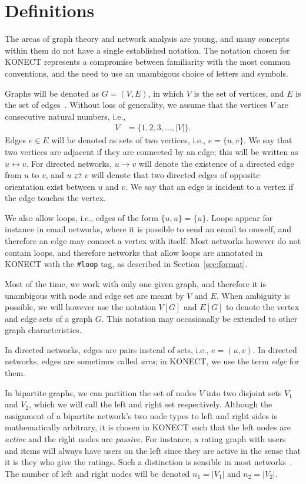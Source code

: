 \documentclass{article}
\begin{document}
\section{Definitions}
\label{sec:definitions}
The areas of graph theory and network analysis are young, and
many concepts within them do not have a single established notation.  The
notation chosen for KONECT represents a compromise between familiarity
with the most common conventions, and the need to use an unambigous
choice of letters and symbols. 

Graphs will be denoted as $G=(V,E)$, in which $V$ is the set of
vertices, and $E$ is the set of edges~\cite{b116}. Without loss of
generality, we assume that the vertices $V$ are consecutive natural
numbers, i.e.,
\begin{align}
  V &= \{ 1, 2, 3, \dotsc, |V| \}.
\end{align}
Edges $e\in E$ will be denoted as sets of two vertices, i.e.,
$e=\{u,v\}$.  We say that two vertices are adjacent if they are
connected by an edge; this will be written as $u \leftrightarrow v$. 
For directed networks, $u \rightarrow v$ will denote the existence of a
directed edge from $u$ to $v$, and $u \rightleftarrows v$ will denote
that two directed edges of opposite orientation exist between $u$ and $v$.
We say that an
edge is incident to a vertex if the edge touches the vertex.

We also allow loops, i.e., edges of the form $\{u,u\}=\{u\}$.  Loops
appear for instance in email networks, where it is possible to send an
email to oneself, and therefore an edge may connect a vertex with
itself.  Most networks however do not contain loops, and therefore
networks that allow loops are annotated in KONECT with the 
\texttt{\#loop} tag, as described in Section~\ref{sec:format}. 

Most of the time, we work with only one given graph, and therefore it is
unambigous with node and edge set are meant by $V$ and $E$.  When
ambiguity is possible, we will however use the notation
$V[G]$ and $E[G]$ to denote the vertex and edge sets of a graph $G$.
This notation may occasionally be extended to other graph
characteristics. 

In directed networks, edges are pairs instead of sets, i.e.,
$e=(u,v)$.  In directed networks, edges are sometimes called
\emph{arcs}; in KONECT, we use the term \emph{edge} for them. 

In bipartite graphs, we can partition the set of nodes $V$ into two
disjoint sets $V_1$ and $V_2$, which we will call the left and right
set respectively.  Although the assignment of a bipartite network's two
node types to left and right sides is mathematically arbitrary, it is
chosen in KONECT such that the left nodes are \emph{active} and the
right nodes are \emph{passive}.  For instance, a rating graph with users
and items will always have users on the left since they are active in
the sense that it is they who give the ratings.  
Such a distinction is sensible in most networks~\cite{b732}.
The number of left and
right nodes will be denoted $n_1 = |V_1|$ and $n_2 = |V_2|$. 
\end{document}
